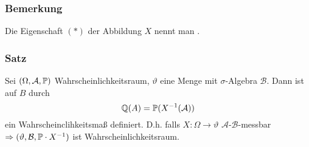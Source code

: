 \subsubsection{Bemerkung}
Die Eigenschaft $(*)$ der Abbildung $X$ nennt man .
\subsubsection{Satz}
Sei $(\Omega,\mathcal{A},\mathbb{P})$ Wahrscheinlichkeitsraum, $\vartheta$ eine Menge mit $\sigma$-Algebra $\mathcal{B}$. Dann ist auf $B$ durch
\[\mathbb{Q}(A)=\mathbb{P}(X^{-1}(\mathcal{A}))\]
ein Wahrscheinclihkeitsma\ss{} definiert. D.h. falls $X\colon\Omega\to\vartheta$ $\mathcal{A}$-$\mathcal{B}$-messbar $\Rightarrow(\vartheta,\mathcal{B},\mathbb{P}\cdot X^{-1})$ ist Wahrscheinlichkeitsraum.
